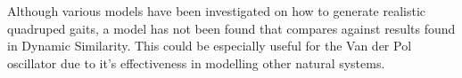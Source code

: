 Although various models have been investigated on how to generate realistic quadruped gaits, a model has not been found that compares against results found in Dynamic Similarity. This could be especially useful for the Van der Pol oscillator due to it's effectiveness in modelling other natural systems.




